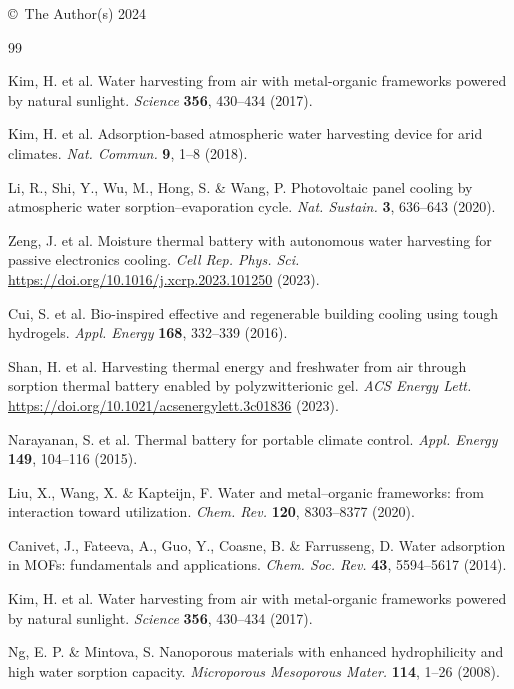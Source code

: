 \documentclass[11pt]{article}
\begin{document}
\bigskip
\noindent \copyright\ The Author(s) 2024

\begin{thebibliography}{99}

 Kim, H. et al. Water harvesting from air with metal-organic frameworks powered by natural sunlight. \textit{Science} \textbf{356}, 430--434 (2017).

 Kim, H. et al. Adsorption-based atmospheric water harvesting device for arid climates. \textit{Nat. Commun.} \textbf{9}, 1--8 (2018).

 Li, R., Shi, Y., Wu, M., Hong, S. \& Wang, P. Photovoltaic panel cooling by atmospheric water sorption--evaporation cycle. \textit{Nat. Sustain.} \textbf{3}, 636--643 (2020).

 Zeng, J. et al. Moisture thermal battery with autonomous water harvesting for passive electronics cooling. \textit{Cell Rep. Phys. Sci.} \url{https://doi.org/10.1016/j.xcrp.2023.101250} (2023).

 Cui, S. et al. Bio-inspired effective and regenerable building cooling using tough hydrogels. \textit{Appl. Energy} \textbf{168}, 332--339 (2016).

 Shan, H. et al. Harvesting thermal energy and freshwater from air through sorption thermal battery enabled by polyzwitterionic gel. \textit{ACS Energy Lett.} \url{https://doi.org/10.1021/acsenergylett.3c01836} (2023).

 Narayanan, S. et al. Thermal battery for portable climate control. \textit{Appl. Energy} \textbf{149}, 104--116 (2015).

 Liu, X., Wang, X. \& Kapteijn, F. Water and metal--organic frameworks: from interaction toward utilization. \textit{Chem. Rev.} \textbf{120}, 8303--8377 (2020).

 Canivet, J., Fateeva, A., Guo, Y., Coasne, B. \& Farrusseng, D. Water adsorption in MOFs: fundamentals and applications. \textit{Chem. Soc. Rev.} \textbf{43}, 5594--5617 (2014).

 Kim, H. et al. Water harvesting from air with metal-organic frameworks powered by natural sunlight. \textit{Science} \textbf{356}, 430--434 (2017).

 Ng, E. P. \& Mintova, S. Nanoporous materials with enhanced hydrophilicity and high water sorption capacity. \textit{Microporous Mesoporous Mater.} \textbf{114}, 1--26 (2008).


\end{thebibliography}
\end{document}
